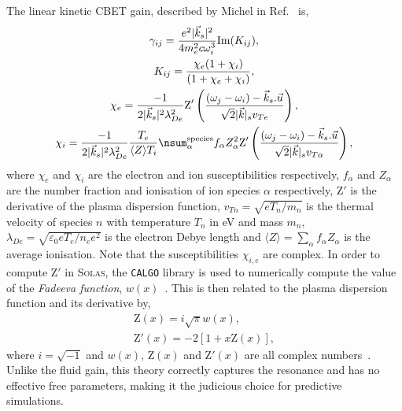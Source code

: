 The linear kinetic \ac{CBET} gain, described by Michel in Ref.~\cite{michel_saturation_2013} is,
\begin{equation}
    \label{eq:SOLAS_CBET_kinetc_gain}
    \begin{gathered}
        \gamma_{ij} = \frac{e^2 |\vec{k}_s|^2}{4 m_e^2 c \omega_i^3}\text{Im}(K_{ij}), \\
        K_{ij} = \frac{\chi_e(1+\chi_i)}{(1+\chi_e+\chi_i)}, \\
        \chi_e = \frac{-1}{2 |\vec{k}_s|^2 \lambda_{De}^2} \text{Z}'\left( \frac{(\omega_j-\omega_i)-\vec{k}_s.\vec{u}}{\sqrt{2} |\vec{k}|_s v_{Te}} \right), \\
        \chi_i = \frac{-1}{2 |\vec{k}_s|^2 \lambda_{De}^2} \frac{T_e}{\langle Z\rangle T_i} \nsum_{\alpha}^{\text{species}} f_{\alpha}Z_{\alpha}^2  \text{Z}'\left( \frac{(\omega_j-\omega_i)-\vec{k}_s.\vec{u}}{\sqrt{2} |\vec{k}|_s v_{T\alpha}} \right), \\
    \end{gathered}
\end{equation}
where $\chi_e$ and $\chi_i$ are the electron and ion susceptibilities respectively, $f_{\alpha}$ and $Z_{\alpha}$ are the number fraction and ionisation of ion species $\alpha$ respectively, $\text{Z}'$ is the derivative of the plasma dispersion function, $v_{Tn}=\sqrt{e T_n/m_n}$ is the thermal velocity of species $n$ with temperature $T_n$ in eV and mass $m_n$, $\lambda_{De}=\sqrt{\varepsilon_0 e T_e / n_e e^2}$ is the electron Debye length and $\langle Z \rangle = \sum_{\alpha}f_{\alpha}Z_{\alpha}$ is the average ionisation.
Note that the susceptibilities $\chi_{i,e}$ are complex.
In order to compute $\text{Z}'$ in \textsc{Solas}, the \texttt{CALGO} library is used to numerically compute the value of the \textit{Fadeeva function}, $w(x)$~\cite{poppe_algorithm_1990}.
This is then related to the plasma dispersion function and its derivative by,
\begin{equation}
    \label{eq:SOLAS_plasma_disp_func}
    \begin{gathered}
        \text{Z}(x) = i\sqrt{\pi} w(x), \\
        \text{Z}'(x) = -2 [1 + x \text{Z}(x)],
    \end{gathered}
\end{equation}
where $i=\sqrt{-1}$ and $w(x)$, $\text{Z}(x)$ and $\text{Z}'(x)$ are all complex numbers~\cite{fried_plasma_1961}.
Unlike the fluid gain, this theory correctly captures the resonance and has no effective free parameters, making it the judicious choice for predictive simulations.
